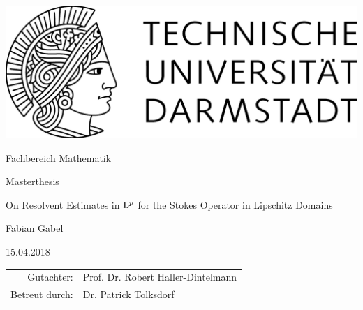 \begin{titlepage}
  \begin{center}
    \includegraphics[width=0.5\linewidth]{TU_Darmstadt_Logo.pdf}
    \vfill
    
    \large{Fachbereich Mathematik}
    \vfill
    
    \large{Masterthesis}
    \vfill

    \huge{On Resolvent Estimates in $\mathrm{L}^p$ for the Stokes Operator in Lipschitz Domains}
    \vfill
    
		\large
    Fabian Gabel

    \large 15.04.2018
    \vfill
\begin{tabular}{rl}
    Gutachter:& Prof. Dr. Robert Haller-Dintelmann
    \\
    Betreut durch:& Dr. Patrick Tolksdorf
\end{tabular}
  \end{center}
\end{titlepage}
